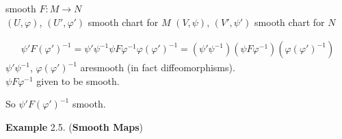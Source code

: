 
smooth $F: M \to N$  \\
$(U,\varphi)$, $(U',\varphi')$ smooth chart for $M$
$(V,\psi)$, $(V',\psi')$ smooth chart for $N$

\[
\begin{gathered}
  \psi' F(\varphi')^{-1} = \psi' \psi^{-1} \psi F \varphi^{-1} \varphi (\varphi')^{-1} = (\psi' \psi^{-1}) ( \psi F \varphi^{-1})(\varphi (\varphi')^{-1})
\end{gathered}
\]
$\psi' \psi^{-1}$, $\varphi (\varphi')^{-1}$ aresmooth (in fact diffeomorphisms).  \\
$\psi F \varphi^{-1}$ given to be smooth.  

So $\psi' F(\varphi')^{-1}$ smooth.  


\textbf{Example} 2.5. (\textbf{Smooth Maps})

